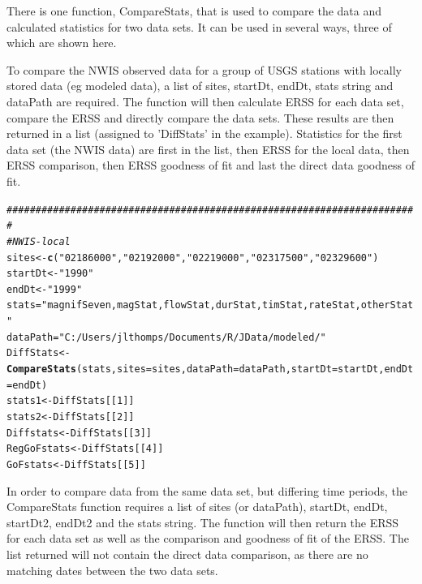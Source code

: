 \documentclass[a4paper,11pt]{article}\usepackage[]{graphicx}\usepackage[]{color}
\makeatletter
\newcommand{\hlnum}[1]{\textcolor[rgb]{0.686,0.059,0.569}{#1}}%
\newcommand{\hlstr}[1]{\textcolor[rgb]{0.192,0.494,0.8}{#1}}%
\newcommand{\hlcom}[1]{\textcolor[rgb]{0.678,0.584,0.686}{\textit{#1}}}%
\newcommand{\hlstd}[1]{\textcolor[rgb]{0.345,0.345,0.345}{#1}}%
\newcommand{\hlkwb}[1]{\textcolor[rgb]{0.69,0.353,0.396}{#1}}%
\newcommand{\hlkwc}[1]{\textcolor[rgb]{0.333,0.667,0.333}{#1}}%
\newcommand{\hlkwd}[1]{\textcolor[rgb]{0.737,0.353,0.396}{\textbf{#1}}}%
\newenvironment{kframe}{%
 \def\at@end@of@kframe{}%
 \ifinner\ifhmode%
  \def\at@end@of@kframe{\end{minipage}}%
  \begin{minipage}{\columnwidth}%
 \fi\fi%
 \def\FrameCommand##1{\hskip\@totalleftmargin \hskip-\fboxsep
 \colorbox{shadecolor}{##1}\hskip-\fboxsep
     \hskip-\linewidth \hskip-\@totalleftmargin \hskip\columnwidth}%
 \MakeFramed {\advance\hsize-\width
   \@totalleftmargin\z@ \linewidth\hsize
   \@setminipage}}%
 {\par\unskip\endMakeFramed%
 \at@end@of@kframe}
\newenvironment{knitrout}{}{} %
\makeatother
\begin{document}
There is one function, CompareStats, that is used to compare the data and calculated statistics for two data sets. It can be used in several ways, three of which are shown here. 

To compare the NWIS observed data for a group of USGS stations with locally stored data (eg modeled data), a list of sites, startDt, endDt, stats string and dataPath are required. The function will then calculate ERSS for each data set, compare the ERSS and directly compare the data sets. These results are then returned in a list (assigned to 'DiffStats' in the example). Statistics for the first data set (the NWIS data) are first in the list, then ERSS for the local data, then ERSS comparison, then ERSS goodness of fit and last the direct data goodness of fit.

\begin{knitrout}
\color{fgcolor}\begin{kframe}
\begin{alltt}
\hlcom{#######################################################################}
\hlcom{# NWIS-local}
\hlstd{sites} \hlkwb{<-} \hlkwd{c}\hlstd{(}\hlstr{"02186000"}\hlstd{,}\hlstr{"02192000"}\hlstd{,}\hlstr{"02219000"}\hlstd{,}\hlstr{"02317500"}\hlstd{,}\hlstr{"02329600"}\hlstd{)}
\hlstd{startDt} \hlkwb{<-} \hlstr{"1990"}
\hlstd{endDt} \hlkwb{<-} \hlstr{"1999"}
\hlstd{stats}\hlkwb{=}\hlstr{"magnifSeven,magStat,flowStat,durStat,timStat,rateStat,otherStat"}
\hlstd{dataPath}\hlkwb{=}\hlstr{"C:/Users/jlthomps/Documents/R/JData/modeled/"}
\hlstd{DiffStats} \hlkwb{<-} \hlkwd{CompareStats}\hlstd{(stats,}\hlkwc{sites}\hlstd{=sites,}\hlkwc{dataPath}\hlstd{=dataPath,}\hlkwc{startDt}\hlstd{=startDt,}\hlkwc{endDt}\hlstd{=endDt)}
\hlstd{stats1} \hlkwb{<-} \hlstd{DiffStats[[}\hlnum{1}\hlstd{]]}
\hlstd{stats2} \hlkwb{<-} \hlstd{DiffStats[[}\hlnum{2}\hlstd{]]}
\hlstd{Diffstats} \hlkwb{<-} \hlstd{DiffStats[[}\hlnum{3}\hlstd{]]}
\hlstd{RegGoFstats} \hlkwb{<-} \hlstd{DiffStats[[}\hlnum{4}\hlstd{]]}
\hlstd{GoFstats} \hlkwb{<-} \hlstd{DiffStats[[}\hlnum{5}\hlstd{]]}
\end{alltt}
\end{kframe}
\end{knitrout}

In order to compare data from the same data set, but differing time periods, the CompareStats function requires a list of sites (or dataPath), startDt, endDt, startDt2, endDt2 and the stats string. The function will then return the ERSS for each data set as well as the comparison and goodness of fit of the ERSS. The list returned will not contain the direct data comparison, as there are no matching dates between the two data sets. 
\end{document}

